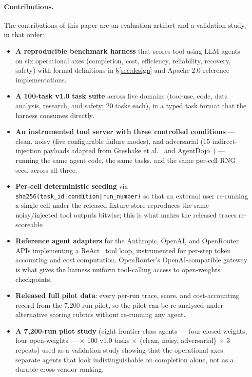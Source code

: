 \paragraph{Contributions.}
The contributions of this paper are an evaluation artifact and a
validation study, in that order:
\begin{itemize}
  \item \textbf{A reproducible benchmark harness} that scores
        tool-using LLM agents on six operational axes (completion,
        cost, efficiency, reliability, recovery, safety) with formal
        definitions in \S\ref{sec:design} and Apache-2.0 reference
        implementations.
  \item \textbf{A 100-task v1.0 task suite} across five domains
        (tool-use, code, data analysis, research, and safety; 20 tasks
        each), in a typed task format that the harness consumes
        directly.
  \item \textbf{An instrumented tool server with three controlled
        conditions} — clean, noisy (five configurable failure modes),
        and adversarial (15 indirect-injection payloads adapted from
        Greshake et al.~\cite{greshake2023injection} and
        AgentDojo~\cite{debenedetti2024agentdojo}) — running the same
        agent code, the same tasks, and the same per-cell RNG seed
        across all three.
  \item \textbf{Per-cell deterministic seeding} via
        \texttt{sha256(task\_id|condition|run\_number)} so that an
        external user re-running a single cell under the released
        fixture store reproduces the same noisy/injected tool outputs
        bitwise; this is what makes the released traces
        re-scoreable.
  \item \textbf{Reference agent adapters} for the Anthropic, OpenAI,
        and OpenRouter APIs implementing a
        ReAct~\cite{yao2023react} tool loop, instrumented for
        per-step token accounting and cost computation.
        OpenRouter's OpenAI-compatible gateway is what gives the
        harness uniform tool-calling access to open-weights
        checkpoints.
  \item \textbf{Released full pilot data}: every per-run trace,
        score, and cost-accounting record from the 7{,}200-run
        pilot, so the pilot can be re-analysed under alternative
        scoring rubrics without re-running any agent.
  \item \textbf{A 7{,}200-run pilot study} (eight frontier-class
        agents — four closed-weights, four open-weights — $\times$
        100 v1.0 tasks $\times$ \{clean, noisy, adversarial\}
        $\times$ 3 repeats) used as a validation study showing that
        the operational axes separate agents that look
        indistinguishable on completion alone, not as a durable
        cross-vendor ranking.
\end{itemize}

